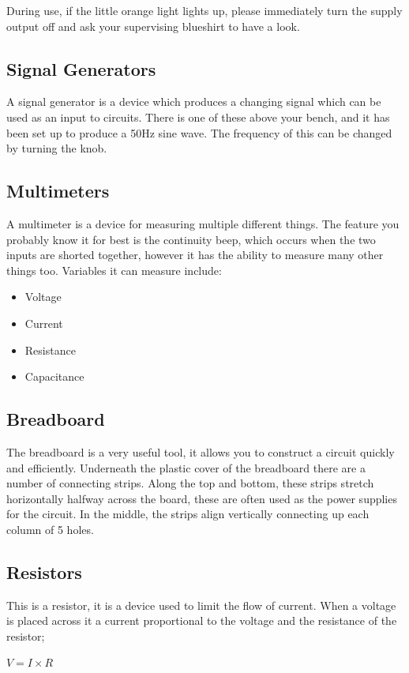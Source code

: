 During use, if the little orange light lights up, please immediately turn the supply output off and ask your supervising blueshirt to have a look.

\subsection{Signal Generators}
A signal generator is a device which produces a changing signal which can be used as an input to circuits.
There is one of these above your bench, and it has been set up to produce a 50Hz sine wave.
The frequency of this can be changed by turning the knob.

\subsection{Multimeters}
A multimeter is a device for measuring multiple different things.
The feature you probably know it for best is the continuity beep, which occurs when the two inputs are shorted together, however it has the ability to measure many other things too.
Variables it can measure include:
\begin{itemize}
\item Voltage
\item Current
\item Resistance
\item Capacitance
\end{itemize}

\subsection{Breadboard}
The breadboard is a very useful tool, it allows you to construct a circuit quickly and efficiently.
Underneath the plastic cover of the breadboard there are a number of connecting strips.
Along the top and bottom, these strips stretch horizontally halfway across the board, these are often used as the power supplies for the circuit.
In the middle, the strips align vertically connecting up each column of 5 holes.

\subsection{Resistors}
This is a resistor, it is a device used to limit the flow of current.
When a voltage is placed across it a current proportional to the voltage and the resistance of the resistor;

$V = I \times R$

